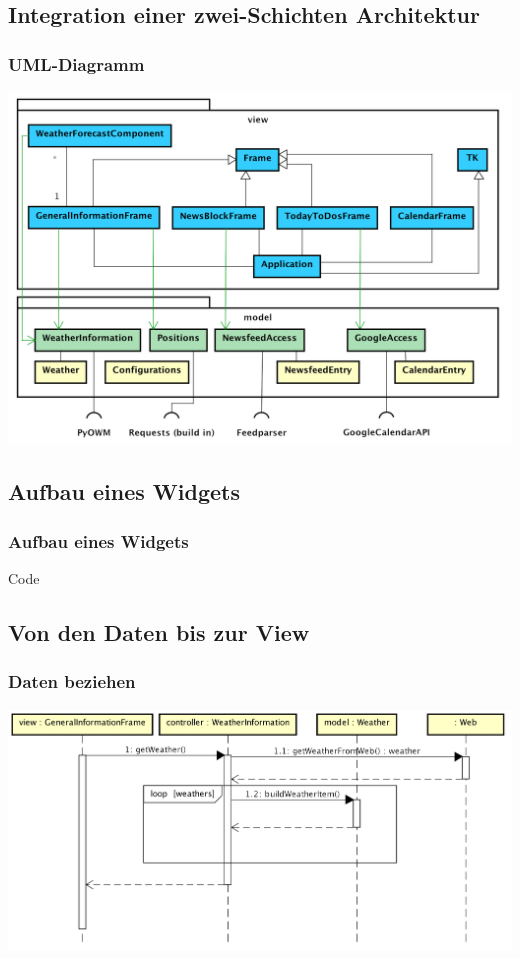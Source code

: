 \documentclass[11pt]{beamer}
\begin{document}
	\subsection{Integration einer zwei-Schichten Architektur}
	\begin{frame}
		\frametitle{UML-Diagramm}
		\begin{center}
			\includegraphics[height=.7\paperheight]{images/umlDiagramNoBackground}
		\end{center}
	\end{frame}

	\subsection{Aufbau eines Widgets}
\begin{frame}[fragile]
	\frametitle{Aufbau eines Widgets}
		
\begin{block}{Code}

\end{block}
\end{frame}

	\subsection{Von den Daten bis zur View}
	\begin{frame}
		\frametitle{Daten beziehen}
		\begin{center}
			\includegraphics[height=.55\paperheight]{images/sequenceDiagramGettingDataNoBackground}
		\end{center}
	\end{frame}
\end{document}
